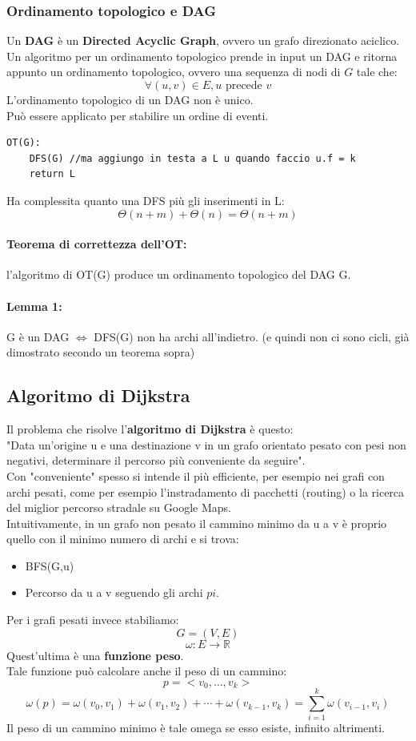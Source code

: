 \documentclass[a4paper,12pt]{article}
\begin{document}
\subsubsection{Ordinamento topologico e DAG}
Un \textbf{DAG} è un \textbf{Directed Acyclic Graph}, ovvero un grafo direzionato aciclico.\\
Un algoritmo per un ordinamento topologico prende in input un DAG e ritorna appunto un ordinamento topologico, ovvero una sequenza di nodi di $G$ tale che:
\[
\forall (u,v) \in E, u \text{ precede } v
\]
L'ordinamento topologico di un DAG non è unico.\\
Può essere applicato per stabilire un ordine di eventi.\\
\begin{lstlisting}
OT(G):
    DFS(G) //ma aggiungo in testa a L u quando faccio u.f = k
    return L
\end{lstlisting}
Ha complessita quanto una DFS più gli inserimenti in L:
\[
\Theta(n+m) + \Theta(n) = \Theta(n+m)
\]
\paragraph{Teorema di correttezza dell'OT:} l'algoritmo di OT(G) produce un ordinamento topologico del DAG G.
\paragraph{Lemma 1:} G è un DAG $\Leftrightarrow$ DFS(G) non ha archi all'indietro. (e quindi non ci sono cicli, già dimostrato secondo un teorema sopra)
\subsection{Algoritmo di Dijkstra}
Il problema che risolve l'\textbf{algoritmo di Dijkstra} è questo:\\
"Data un'origine u e una destinazione v in un grafo orientato pesato con pesi non negativi, determinare il percorso più conveniente da seguire".\\
Con "conveniente" spesso si intende il più efficiente, per esempio nei grafi con archi pesati, come per esempio l'instradamento di pacchetti (routing) o la ricerca del miglior percorso stradale su Google Maps.\\
Intuitivamente, in un grafo non pesato il cammino minimo da u a v è proprio quello con il minimo numero di archi e si trova:
\begin{itemize}
    \item BFS(G,u)
    \item Percorso da u a v seguendo gli archi $pi$.
\end{itemize}
Per i grafi pesati invece stabiliamo:
\[
G = (V,E)
\]
\[
\omega: E \to \mathbb{R}
\]
Quest'ultima è una \textbf{funzione peso}.\\
Tale funzione può calcolare anche il peso di un cammino:\\
\[
p = <v_0,\ldots,v_k>
\]
\[
\omega(p) = \omega(v_0,v_1) + \omega(v_1,v_2) + \cdots + \omega(v_{k-1},v_k) = \sum_{i = 1}^{k} \omega(v_{i-1},v_i)
\]
Il peso di un cammino minimo è tale omega se esso esiste, infinito altrimenti.
\end{document}
